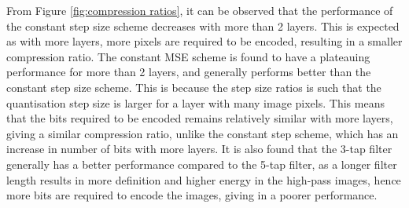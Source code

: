 From Figure \ref{fig:compression ratios}, it can be observed that the performance of the constant step size scheme decreases with more than 2 layers. This is expected as with more layers, more pixels are required to be encoded, resulting in a smaller compression ratio. The constant MSE scheme is found to have a plateauing performance for more than 2 layers, and generally performs better than the constant step size scheme. This is because the step size ratios is such that the quantisation step size is larger for a layer with many image pixels. This means that the bits required to be encoded remains relatively similar with more layers, giving a similar compression ratio, unlike the constant step scheme, which has an increase in number of bits with more layers. It is also found that the 3-tap filter generally has a better performance compared to the 5-tap filter, as a longer filter length results in more definition and higher energy in the high-pass images, hence more bits are required to encode the images, giving in a poorer performance.
